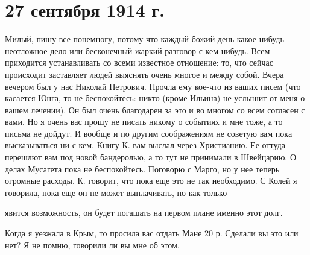 \section{27 сентября 1914 г.}


Милый, пишу все понемногу, потому что каждый божий день какое-нибудь неотложное
дело или бесконечный жаркий разговор с кем-нибудь. Всем приходится
устанавливать со всеми известное отношение: то, что сейчас происходит
заставляет людей выяснять очень многое и между собой. Вчера вечером был у нас
Николай Петрович. Прочла ему кое-что из ваших писем (что касается Юнга, то не
беспокойтесь: никто (кроме Ильина) не услышит от меня о вашем лечении). Он был
очень благодарен за это и во многом со всем согласен с вами. Но я очень вас
прошу не писать никому о событиях и мне тоже, а то письма не дойдут. И вообще и
по другим соображениям не советую вам пока высказываться ни с кем. Книгу К. вам
выслал через Христианию. Ее оттуда перешлют вам под новой бандеролью, а то тут
не принимали в Швейцарию. О делах Мусагета пока не беспокойтесь. Поговорю с
Марго, но у нее теперь огромные расходы. К. говорит, что пока еще это не так
необходимо. С Колей я говорила, пока еще он не может выплачивать, но как
только


\noindent
явится возможность, он будет погашать на первом плане именно этот долг.


Когда я уезжала в Крым, то просила вас отдать Мане 20 р.
Сделали вы это или нет?
Я не помню, говорили ли вы мне об этом.
